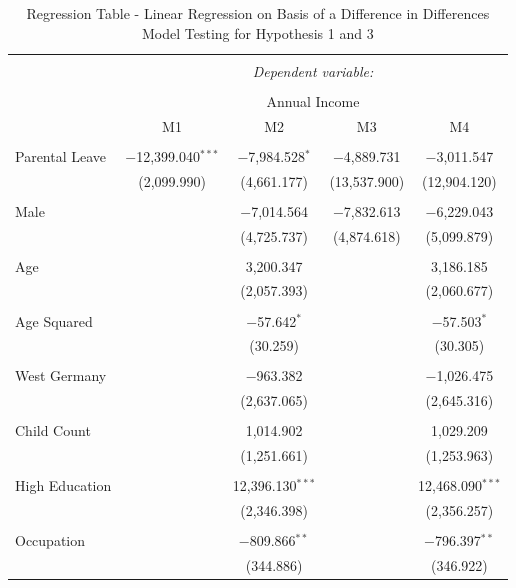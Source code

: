 \documentclass[
  11pt,
]{article}
\begin{document}
\begin{table}[!htbp] \centering 
  \caption{Regression Table - Linear Regression on Basis of a Difference in Differences Model Testing for Hypothesis 1 and 3} 
  \label{tab2} 
\footnotesize 
\begin{tabular}{@{\extracolsep{-5pt}}lcccc} 
\\[-1.8ex]\hline 
\hline \\[-1.8ex] 
 & \multicolumn{4}{c}{\textit{Dependent variable:}} \\ 
\cline{2-5} 
\\[-1.8ex] & \multicolumn{4}{c}{Annual Income} \\ 
 & M1 & M2 & M3 & M4 \\ 
\hline \\[-1.8ex] 
 Parental Leave & $-$12,399.040$^{***}$ & $-$7,984.528$^{*}$ & $-$4,889.731 & $-$3,011.547 \\ 
  & (2,099.990) & (4,661.177) & (13,537.900) & (12,904.120) \\ 
  & & & & \\ 
 Male &  & $-$7,014.564 & $-$7,832.613 & $-$6,229.043 \\ 
  &  & (4,725.737) & (4,874.618) & (5,099.879) \\ 
  & & & & \\ 
 Age &  & 3,200.347 &  & 3,186.185 \\ 
  &  & (2,057.393) &  & (2,060.677) \\ 
  & & & & \\ 
 Age Squared &  & $-$57.642$^{*}$ &  & $-$57.503$^{*}$ \\ 
  &  & (30.259) &  & (30.305) \\ 
  & & & & \\ 
 West Germany &  & $-$963.382 &  & $-$1,026.475 \\ 
  &  & (2,637.065) &  & (2,645.316) \\ 
  & & & & \\ 
 Child Count &  & 1,014.902 &  & 1,029.209 \\ 
  &  & (1,251.661) &  & (1,253.963) \\ 
  & & & & \\ 
 High Education &  & 12,396.130$^{***}$ &  & 12,468.090$^{***}$ \\ 
  &  & (2,346.398) &  & (2,356.257) \\ 
  & & & & \\ 
 Occupation &  & $-$809.866$^{**}$ &  & $-$796.397$^{**}$ \\ 
  &  & (344.886) &  & (346.922) \\ 

\end{tabular}
\end{table}
\end{document}
